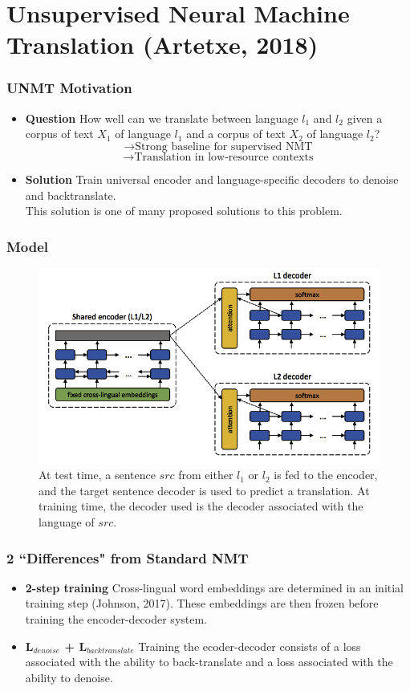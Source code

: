 \documentclass{beamer}
\begin{document}
\section{Unsupervised Neural Machine Translation (Artetxe, 2018)}
\begin{frame}
\frametitle{UNMT Motivation}
\begin{itemize}
\item \textbf{Question} How well can we translate between language $l_1$ and $l_2$ given a corpus of text $X_1$ of language $l_1$ and a corpus of text $X_2$ of language $l_2$?\\
$$\rightarrow \text{Strong baseline for supervised NMT}$$
$$\rightarrow \text{Translation in low-resource contexts}$$
\pause
\item \textbf{Solution} Train universal encoder and language-specific decoders to denoise and backtranslate.\\\pause
This solution is one of many proposed solutions to this problem.
\end{itemize}
\end{frame}

\begin{frame}
\frametitle{Model}
 \begin{figure}
  \centering
  \includegraphics[width=.8\textwidth]{pres_imgs/unsupmodel}
  \caption{\label{fig:unsupmodel} At test time, a sentence $src$ from either $l_1$ or $l_2$ is fed to the encoder, and the target sentence decoder is used to predict a translation. At training time, the decoder used is the decoder associated with the language of $src$.}
\end{figure}

\end{frame}

\begin{frame}
\frametitle{2 ``Differences" from Standard NMT}\pause
\begin{itemize}
\item \textbf{2-step training} Cross-lingual word embeddings are determined in an initial training step (Johnson, 2017). These embeddings are then frozen before training the encoder-decoder system. \pause
\item \textbf{L$_{denoise}$ + L$_{backtranslate}$} Training the ecoder-decoder consists of a loss associated with the ability to back-translate and a loss associated with the ability to denoise.
\end{itemize}
\end{frame}
\end{document}
